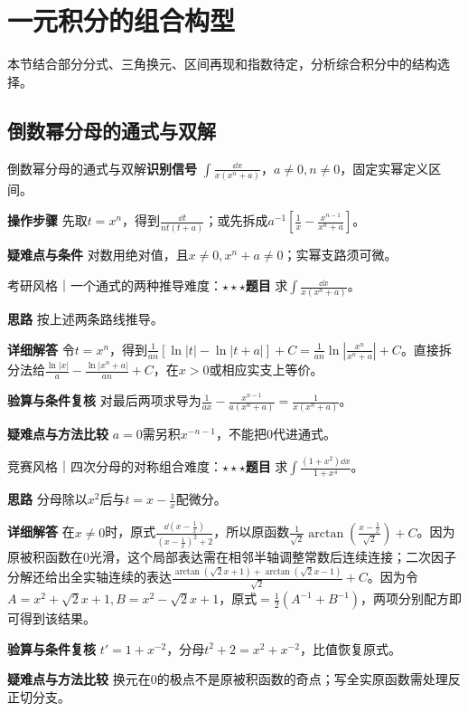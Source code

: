 \section{一元积分的组合构型}\label{ic:delta_integral}

\begin{examtip}本节结合部分分式、三角换元、区间再现和指数待定，分析综合积分中的结构选择。\end{examtip}

\subsection{倒数幂分母的通式与双解}\label{ic:delta_integral:reciprocalpower}\begin{method}{倒数幂分母的通式与双解}\textbf{识别信号} $\int\frac{\dd x}{x(x^n+a)}$，$a\ne0,n\ne0$，固定实幂定义区间。\par \textbf{操作步骤} 先取$t=x^n$，得到$\frac{\dd t}{nt(t+a)}$；或先拆成$a^{-1}[\frac{1}{x}-\frac{x^{n-1}}{x^n+a}]$。\par \textbf{疑难点与条件} 对数用绝对值，且$x\ne0,x^n+a\ne0$；实幂支路须可微。\end{method}

\begin{example}{考研风格｜一个通式的两种推导}{难度：$\star\star\star$}\label{ic:ex:delta_integral:reciprocalformula}\textbf{题目} 求$\int\frac{\dd x}{x(x^n+a)}$。\par \textbf{思路} 按上述两条路线推导。\par \textbf{详细解答} 令$t=x^n$，得到$\frac1{an}[\ln|t|-\ln|t+a|]+C=\frac1{an}\ln|\frac{x^n}{x^n+a}|+C$。直接拆分法给$\frac{\ln|x|}{a}-\frac{\ln|x^n+a|}{an}+C$，在$x>0$或相应实支上等价。\par \textbf{验算与条件复核} 对最后两项求导为$\frac{1}{ax}-\frac{x^{n-1}}{a(x^n+a)}=\frac{1}{x(x^n+a)}$。\par \textbf{疑难点与方法比较} $a=0$需另积$x^{-n-1}$，不能把0代进通式。\end{example}

\begin{example}{竞赛风格｜四次分母的对称组合}{难度：$\star\star\star$}\label{ic:ex:delta_integral:quarticcombination}\textbf{题目} 求$\int\frac{(1+x^2)\dd x}{1+x^4}$。\par \textbf{思路} 分母除以$x^2$后与$t=x-\frac{1}{x}$配微分。\par \textbf{详细解答} 在$x\ne0$时，原式$\frac{\dd(x-\frac{1}{x})}{(x-\frac{1}{x})^2+2}$，所以原函数$\frac1{\sqrt2}\arctan(\frac{x-\frac{1}{x}}{\sqrt2})+C$。因为原被积函数在0光滑，这个局部表达需在相邻半轴调整常数后连续连接；二次因子分解还给出全实轴连续的表达$\frac{\arctan(\sqrt2x+1)+\arctan(\sqrt2x-1)}{\sqrt2}+C$。因为令$A=x^2+\sqrt2x+1,B=x^2-\sqrt2x+1$，原式$=\frac12(A^{-1}+B^{-1})$，两项分别配方即可得到该结果。\par \textbf{验算与条件复核} $t'=1+x^{-2}$，分母$t^2+2=x^2+x^{-2}$，比值恢复原式。\par \textbf{疑难点与方法比较} 换元在0的极点不是原被积函数的奇点；写全实原函数需处理反正切分支。\end{example}

